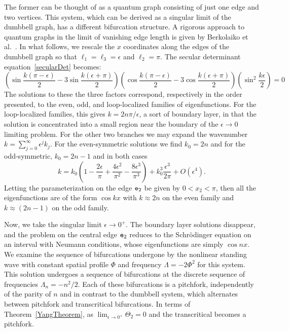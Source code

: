 \documentclass{article}
\numberwithin{equation}{section}
\numberwithin{figure}{section}
\begin{document}
The former can be thought of as a quantum graph consisting of just one edge and two vertices. This system, which can be derived as a singular limit of the dumbbell graph, has a different bifurcation structure. A rigorous approach to quantum graphs in the limit of vanishing edge length is given by Berkolaiko et al.~\cite{Berkolaiko:2018}. In what follows, we rescale the $x$ coordinates along the edges of the dumbbell graph so that $\ell_1= \ell_3=\epsilon$ and $\ell_2 = \pi$. The secular determinant equation~\eqref{secularDet} becomes:
$$
\left(
\sin{\frac{k (\pi -\epsilon )}{2} }-3 \sin{\frac{k (\epsilon +\pi )}{2} }
\right) 
\left(
\cos{\frac{k (\pi -\epsilon )}{2} }-3 \cos{\frac{k (\epsilon +\pi )}{2} }
\right)
\left(
\sin^2{\frac{k \epsilon }{2}}
\right)
= 0
$$
The solutions to these the three factors correspond, respectively in the order presented, to the even, odd, and loop-localized families of eigenfunctions. For the loop-localized families, this gives $k = 2 n \pi/ \epsilon$, a sort of boundary layer, in that the solution is concentrated into a small region near the boundary of the $\epsilon \to 0$ limiting problem. For the other two branches we may expand the wavenumber $k = \sum_{j=0}^\infty \epsilon^j k_j$. For the even-symmetric solutions we find $k_0 = 2 n$ and for the odd-symmetric, $k_0= 2 n -1$ and in both cases
$$
k = k_0 \left(
1 - \frac{2\epsilon}{\pi} + \frac{4 \epsilon^2}{\pi^2}  - \frac{8 \epsilon^3}{\pi^3}
\right) +  k_0^3 \frac{\epsilon^3}{2 \pi} + O(\epsilon^4).
$$
Letting the parameterization on the edge $\mathtt{e}_2$ be given by $0<x_2<\pi$, then all the eigenfunctions are of the form $\cos{k x}$ with $k \approx 2n$ on the even family and $k \approx (2n-1)$ on the odd family. 

Now, we take the singular limit $\epsilon \to 0^+$. The boundary layer solutions disappear, and the problem on the central edge $\mathtt{e}_2$ reduces to the Schr\"odinger equation on an interval with Neumann conditions, whose eigenfunctions are simply $\cos{nx}$. We examine the sequence of bifurcations undergone by the nonlinear standing wave with constant spatial profile $\Phi$ and frequency $\Lambda = -2 \Phi^2$ for this system. This solution undergoes a sequence of bifurcations at the discrete sequence of frequencies $\Lambda_n = -n^2/2$. Each of these bifurcations is a pitchfork, independently of the parity of $n$ and in contrast to the dumbbell system, which alternates between pitchfork and transcritical bifurcations. In terms of Theorem~\ref{YangTheorem}, as $\lim_{\epsilon\to 0^+} \Theta_2 =0$ and the transcritical becomes a pitchfork.
\end{document}
